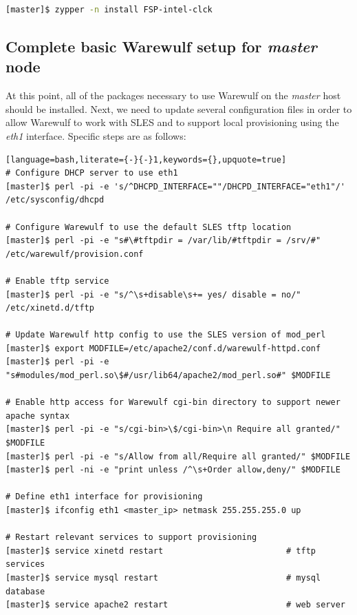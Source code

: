 \documentclass[letterpaper]{article}
\begin{document}
\begin{lstlisting}[language=bash,keywords={}]
[master]$ zypper -n install FSP-intel-clck
\end{lstlisting}


\subsection{Complete basic Warewulf setup for {\em master} node}

At this point, all of the packages necessary to use Warewulf on the {\em
  master} host should be installed.  Next, we need to update several
configuration files in order to allow Warewulf to work with SLES and to support
local provisioning using the {\em eth1} interface.  Specific steps are as
follows:


\begin{lstlisting}[language=bash,literate={-}{-}1,keywords={},upquote=true]
# Configure DHCP server to use eth1
[master]$ perl -pi -e 's/^DHCPD_INTERFACE=""/DHCPD_INTERFACE="eth1"/' /etc/sysconfig/dhcpd

# Configure Warewulf to use the default SLES tftp location
[master]$ perl -pi -e "s#\#tftpdir = /var/lib/#tftpdir = /srv/#" /etc/warewulf/provision.conf

# Enable tftp service
[master]$ perl -pi -e "s/^\s+disable\s+= yes/ disable = no/" /etc/xinetd.d/tftp

# Update Warewulf http config to use the SLES version of mod_perl
[master]$ export MODFILE=/etc/apache2/conf.d/warewulf-httpd.conf
[master]$ perl -pi -e "s#modules/mod_perl.so\$#/usr/lib64/apache2/mod_perl.so#" $MODFILE

# Enable http access for Warewulf cgi-bin directory to support newer apache syntax
[master]$ perl -pi -e "s/cgi-bin>\$/cgi-bin>\n Require all granted/" $MODFILE
[master]$ perl -pi -e "s/Allow from all/Require all granted/" $MODFILE
[master]$ perl -ni -e "print unless /^\s+Order allow,deny/" $MODFILE

# Define eth1 interface for provisioning
[master]$ ifconfig eth1 <master_ip> netmask 255.255.255.0 up

# Restart relevant services to support provisioning
[master]$ service xinetd restart                         # tftp services
[master]$ service mysql restart                          # mysql database
[master]$ service apache2 restart                        # web server
\end{lstlisting}
\end{document}
